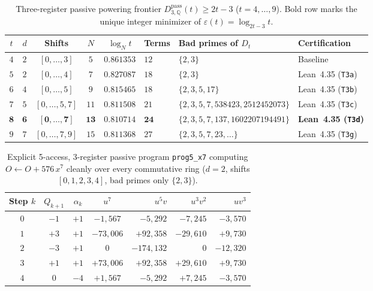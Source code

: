 \documentclass[11pt,reqno]{amsart}
\theoremstyle{definition}
\newcommand{\Q}{\mathbb{Q}}
\newcommand{\pass}{\mathrm{pass}}
\begin{document}
\begin{table}[ht]
\centering
\caption{Three-register passive powering frontier $D_{3,\Q}^{\pass}(t) \ge 2t - 3$ ($t = 4, \dots, 9$).
Bold row marks the unique integer minimizer of $\varepsilon(t) = \log_{2t-3} t$.}
\label{tab:t3-frontier}
\footnotesize
\setlength{\tabcolsep}{4pt}
\begin{tabular}{@{}ccccclll@{}}
\toprule
$t$ & $d$ & Shifts & $N$ & $\log_N t$ & Terms & Bad primes of $D_t$ & Certification \\
\midrule
$4$ & $2$ & $[0,\dots,3]$ & $5$ & $0.861353$ & $12$ & $\{2, 3\}$ & Baseline~\cite{Vinciguerra2026} \\
$5$ & $2$ & $[0,\dots,4]$ & $7$ & $0.827087$ & $18$ & $\{2, 3\}$ & Lean~4.35 (\texttt{T3a}) \\
$6$ & $4$ & $[0,\dots,5]$ & $9$ & $0.815465$ & $18$ & $\{2, 3, 5, 17\}$ & Lean~4.35 (\texttt{T3b}) \\
$7$ & $5$ & $[0,\dots,5,7]$ & $11$ & $0.811508$ & $21$ & $\{2,3,5,7,538423,2512452073\}$ & Lean~4.35 (\texttt{T3c}) \\
$\mathbf{8}$ & $\mathbf{6}$ & $\mathbf{[0,\dots,7]}$ & $\mathbf{13}$ & $\mathbf{0.810714}$ & $\mathbf{24}$ & $\{2,3,5,7,137,1602207194491\}$ & \textbf{Lean~4.35 (\texttt{T3d})} \\
$9$ & $7$ & $[0,\dots,7,9]$ & $15$ & $0.811368$ & $27$ & $\{2,3,5,7,23,\dots\}$ & Lean~4.35 (\texttt{T3g}) \\
\bottomrule
\end{tabular}
\end{table}

\begin{table}[ht]
\centering
\caption{Explicit 5-access, 3-register passive program \texttt{prog5\_x7} computing $O \leftarrow O + 576\, x^7$ cleanly over every commutative ring ($d = 2$, shifts $[0,1,2,3,4]$, bad primes only $\{2, 3\}$).}
\label{tab:prog5}
\small
\begin{tabular}{@{}ccccrrr@{}}
\toprule
Step $k$ & $Q_{k+1}$ & $\alpha_k$ & $u^7$ & $u^5 v$ & $u^3 v^2$ & $u v^3$ \\
\midrule
$0$ & $-1$ & $+1$ & $-1{,}567$ & $-5{,}292$ & $-7{,}245$ & $-3{,}570$ \\
$1$ & $+3$ & $+1$ & $-73{,}006$ & $+92{,}358$ & $-29{,}610$ & $+9{,}730$ \\
$2$ & $-3$ & $+1$ & $0$ & $-174{,}132$ & $0$ & $-12{,}320$ \\
$3$ & $+1$ & $+1$ & $+73{,}006$ & $+92{,}358$ & $+29{,}610$ & $+9{,}730$ \\
$4$ & $0$ & $-4$ & $+1{,}567$ & $-5{,}292$ & $+7{,}245$ & $-3{,}570$ \\
\bottomrule
\end{tabular}
\end{table}
\end{document}
